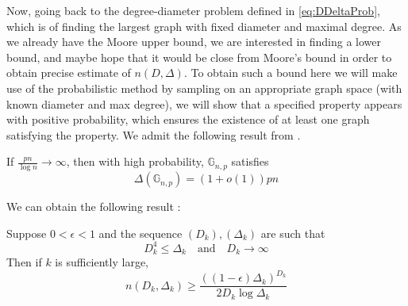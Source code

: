 Now, going back to the degree-diameter problem defined in \eqref{eq:DDeltaProb}, which is of finding the largest graph with fixed diameter and maximal degree.
As we already have the Moore upper bound, we are interested in finding a lower bound, and maybe hope that it would be close from Moore's bound in order to obtain precise estimate of $n(D, \Delta)$.
To obtain such a bound here we will make use of the probabilistic method by sampling on an appropriate graph space (with known diameter and max degree),
we will show that a specified property appears with positive probability, which ensures the existence of at least one graph satisfying the property.
\newline
We admit the following result from \cite{Bollob01}.
\begin{theorem}\label{th:deltap}
	If $\frac{pn}{\log n} \to \infty$, then with high probability, $\mathbb{G}_{n,p}$ satisfies 
	\begin{equation}
		\Delta(\mathbb{G}_{n,p}) = (1+o(1))pn
	\end{equation}
\end{theorem}
We can obtain the following result :
\begin{theorem}
	Suppose $0<\epsilon <1$ and the sequence $(D_k), (\Delta_k)$ are such that 
	\begin{equation}
		D_k^4 \leq \Delta_k \quad \text{and} \quad D_k \to \infty
	\end{equation}
	Then if $k$ is sufficiently large,
	\begin{equation}
		n(D_k, \Delta_k) \geq \frac{((1-\epsilon)\Delta_k)^{D_k}}{2D_k\log \Delta_k}
	\end{equation}
\end{theorem}
